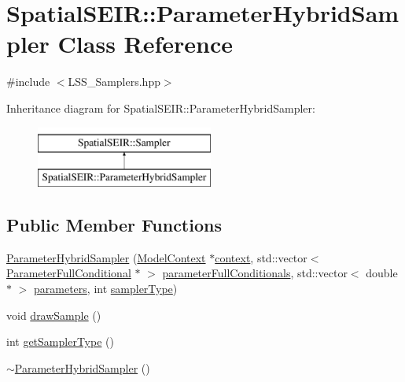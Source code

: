 \hypertarget{classSpatialSEIR_1_1ParameterHybridSampler}{\section{Spatial\-S\-E\-I\-R\-:\-:Parameter\-Hybrid\-Sampler Class Reference}
\label{classSpatialSEIR_1_1ParameterHybridSampler}
}


{\ttfamily \#include $<$L\-S\-S\-\_\-\-Samplers.\-hpp$>$}

Inheritance diagram for Spatial\-S\-E\-I\-R\-:\-:Parameter\-Hybrid\-Sampler\-:\begin{figure}[H]
\begin{center}
\leavevmode
\includegraphics[height=2.000000cm]{classSpatialSEIR_1_1ParameterHybridSampler}
\end{center}
\end{figure}
\subsection*{Public Member Functions}
\begin{DoxyCompactItemize}
\item 
\hyperlink{classSpatialSEIR_1_1ParameterHybridSampler_a49a523f9cb8a4506d15febd00234d4ea}{Parameter\-Hybrid\-Sampler} (\hyperlink{classSpatialSEIR_1_1ModelContext}{Model\-Context} $\ast$\hyperlink{classSpatialSEIR_1_1ParameterHybridSampler_ad0bac901a073df234be795c3c989240b}{context}, std\-::vector$<$ \hyperlink{classSpatialSEIR_1_1ParameterFullConditional}{Parameter\-Full\-Conditional} $\ast$ $>$ \hyperlink{classSpatialSEIR_1_1ParameterHybridSampler_ae9ee223f22eaa7bc7c1a1ac0a046bbb5}{parameter\-Full\-Conditionals}, std\-::vector$<$ double $\ast$ $>$ \hyperlink{classSpatialSEIR_1_1ParameterHybridSampler_a78b4981910745b46803a7257e6cdc348}{parameters}, int \hyperlink{classSpatialSEIR_1_1ParameterHybridSampler_a09803b093b9f8864fc8923d41c25c5d5}{sampler\-Type})
\item 
void \hyperlink{classSpatialSEIR_1_1ParameterHybridSampler_a48bdd9605070604d06bcd576919a06f6}{draw\-Sample} ()
\item 
int \hyperlink{classSpatialSEIR_1_1ParameterHybridSampler_ae5c2d418521cc111a5f6e92e995f823c}{get\-Sampler\-Type} ()
\item 
\hyperlink{classSpatialSEIR_1_1ParameterHybridSampler_a85fe1867df7de09dd23f1b66f499419e}{$\sim$\-Parameter\-Hybrid\-Sampler} ()
\end{DoxyCompactItemize}
